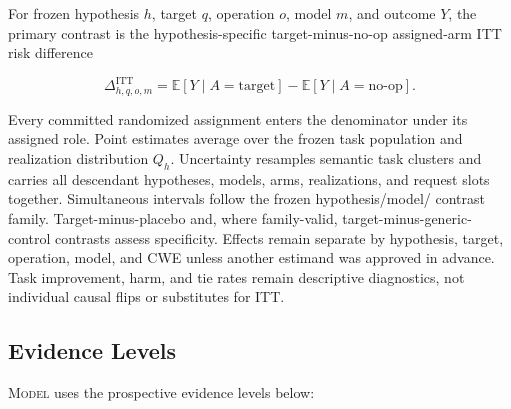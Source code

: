 \documentclass[acmsmall,screen,review,anonymous]{acmart}
\newcommand{\model}{\textsc{Model}\xspace}
\begin{document}
For frozen hypothesis $h$, target $q$, operation $o$, model $m$, and outcome
$Y$, the primary contrast is the hypothesis-specific target-minus-no-op
assigned-arm ITT risk difference

\[
  \Delta^{\mathrm{ITT}}_{h,q,o,m}
  = \mathbb{E}[Y \mid A=\mathrm{target}]
  - \mathbb{E}[Y \mid A=\mathrm{no\mbox{-}op}].
\]

Every committed randomized assignment enters the denominator under its
assigned role. Point estimates average over the frozen task population and
realization distribution $Q_h$. Uncertainty resamples semantic task clusters
and carries all descendant hypotheses, models, arms, realizations, and request
slots together. Simultaneous intervals follow the frozen hypothesis/model/
contrast family. Target-minus-placebo and, where family-valid,
target-minus-generic-control contrasts assess specificity. Effects remain
separate by hypothesis, target, operation, model, and CWE unless another
estimand was approved in advance. Task improvement, harm, and tie rates remain
descriptive diagnostics, not individual causal flips or substitutes for ITT.

\subsection{Evidence Levels}

\model uses the prospective evidence levels below:
\end{document}
